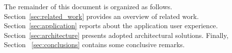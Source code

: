 The remainder of this document is organized as follows. Section~\ref{sec:related_work} provides an overview of related work. Section~\ref{sec:application} reports about the application user experience. Section~\ref{sec:architecture} presents adopted architectural solutions. Finally, Section ~\ref{sec:conclusions} contains some conclusive remarks.
